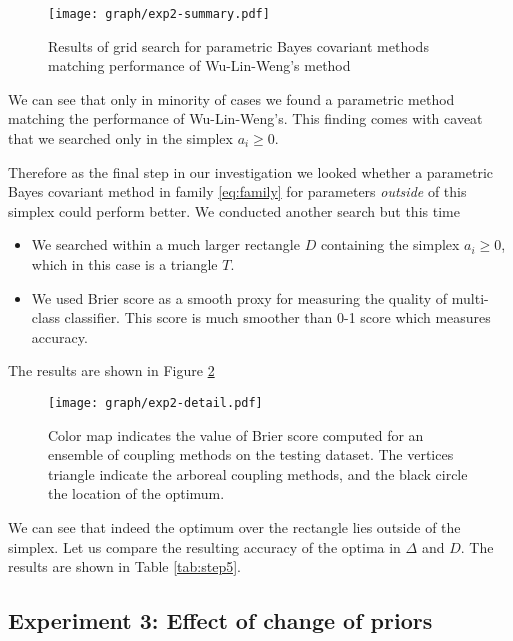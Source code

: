 \documentclass[twoside,11pt]{article}
\begin{document}
\begin{figure}[!ht]
\texttt{[image: graph/exp2-summary.pdf]}
\caption{Results of grid search for parametric Bayes covariant methods matching performance of Wu-Lin-Weng's method}
\label{fig:par-bc}
\end{figure}

We can see that only in minority of cases we found a parametric method matching the performance of Wu-Lin-Weng's. This finding comes with caveat that we searched only in the simplex $a_i \geq 0$. 

Therefore as the final step in our investigation we looked whether a parametric Bayes covariant method in family \eqref{eq:family} for parameters \emph{outside} of this simplex could perform better. We conducted another search but this time
\begin{itemize}
	\item We searched within a much larger rectangle $D$ containing the simplex $a_i\geq 0$, which in this case is a triangle $T$.
	\item We used Brier score as a smooth proxy for measuring the quality of multi-class classifier. This score is much smoother than 0-1 score which measures accuracy.
\end{itemize}

The results are shown in Figure \ref{fig:score}


\begin{figure}[!ht]
	\texttt{[image: graph/exp2-detail.pdf]}
	\caption{Color map indicates the value of Brier score computed for an ensemble of coupling methods on the testing dataset. The vertices triangle indicate the arboreal coupling methods, and the black circle the location of the optimum.}
	\label{fig:score}
\end{figure}

We can see that indeed the optimum over the rectangle lies outside of the simplex. Let us compare the resulting accuracy of the optima in $\Delta$ and $D$. The results are shown in Table \ref{tab:step5}.



\subsection{Experiment 3: Effect of change of priors}  \label{sec:exp3}
\end{document}
